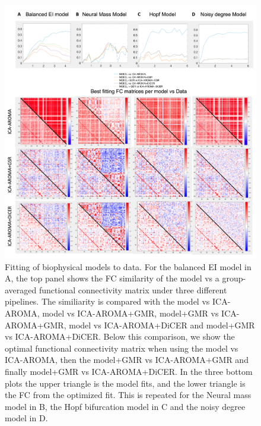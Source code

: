 \documentclass[oneside]{zHenriquesLab-StyleBioRxiv}
\begin{document}
\begin{figure}[ht!]
\includegraphics[width=1\textwidth]{figs/FC_comparisons_all.png}
\caption{Fitting of biophysical models to data. For the balanced EI model in A, the top panel shows the FC similarity of the model vs a group-averaged functional connectivity matrix under three different pipelines. The similiarity is compared with the model vs ICA-AROMA, model vs ICA-AROMA+GMR, model+GMR vs ICA-AROMA+GMR, model vs ICA-AROMA+DiCER and model+GMR vs ICA-AROMA+DiCER. Below this comparison, we show the optimal functional connectivity matrix when using the model vs ICA-AROMA, then the model+GMR vs ICA-AROMA+GMR and finally model+GMR vs ICA-AROMA+DiCER. In the three bottom plots the upper triangle is the model fits, and the lower triangle is the FC from the optimized fit. This is repeated for the Neural mass model in B, the Hopf bifurcation model in C and the noisy degree model in D.}\label{fig:FC_fits}
\end{figure}
\end{document}
